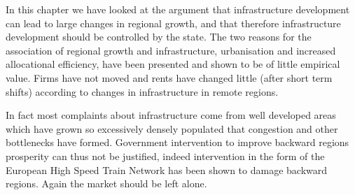 In this chapter we have looked at the argument that infrastructure development can lead to large changes in regional growth, and that therefore infrastructure development should be controlled by the state. The two reasons for the association of regional growth and infrastructure, urbanisation and increased allocational efficiency, have been presented and shown to be of little empirical value. Firms have not moved and rents have changed little (after short term shifts) according to changes in infrastructure in remote regions.

In fact most complaints about infrastructure come from well developed areas which have grown so excessively densely populated that congestion and other bottlenecks have formed. Government intervention to improve backward regions prosperity can thus not be justified, indeed intervention in the form of the European High Speed Train Network has been shown to damage backward regions. Again the market should be left alone.